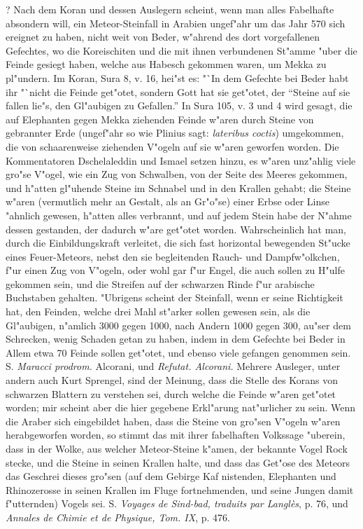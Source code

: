 \documentclass[a4paper, 11pt, oneside, polutonikogreek, german]{article}
\begin{document}
? Nach dem Koran und dessen Auslegern scheint, wenn man alles Fabelhafte absondern will, ein Meteor-Steinfall in Arabien ungef"ahr um das Jahr 570 sich ereignet zu haben, nicht weit von Beder, w"ahrend des dort vorgefallenen Gefechtes, wo die Koreischiten und die mit ihnen verbundenen St"amme "uber die Feinde gesiegt haben, welche aus Habesch gekommen waren, um Mekka zu pl"undern. Im Koran, Sura 8, v. 16, hei"st es: "`In dem Gefechte bei Beder habt ihr "`nicht die Feinde get"otet, sondern Gott hat sie get"otet, der "`Steine auf sie fallen lie"s, den Gl"aubigen zu Gefallen."' In Sura 105, v. 3 und 4 wird gesagt, die auf Elephanten gegen Mekka ziehenden Feinde w"aren durch Steine von gebrannter Erde (ungef"ahr so wie Plinius sagt: \emph{lateribus coctis}) umgekommen, die von schaarenweise ziehenden V"ogeln auf sie w"aren geworfen worden. Die Kommentatoren Dschelaleddin und Ismael setzen hinzu, es w"aren unz"ahlig viele gro"se V"ogel, wie ein Zug von Schwalben, von der Seite des Meeres gekommen, und h"atten gl"uhende Steine im Schnabel und in den Krallen gehabt; die Steine w"aren (vermutlich mehr an Gestalt, als an Gr"o"se) einer Erbse oder Linse "ahnlich gewesen, h"atten alles verbrannt, und auf jedem Stein habe der N"ahme dessen gestanden, der dadurch w"are get"otet worden. Wahrscheinlich hat man, durch die Einbildungskraft verleitet, die sich fast horizontal bewegenden St"ucke eines Feuer-Meteors, nebst den sie begleitenden Rauch- und Dampfw"olkchen, f"ur einen Zug von V"ogeln, oder wohl gar f"ur Engel, die auch sollen zu H"ulfe gekommen sein, und die Streifen auf der schwarzen Rinde f"ur arabische Buchstaben gehalten. "Ubrigens scheint der Steinfall, wenn er seine Richtigkeit hat, den Feinden, welche drei Mahl st"arker sollen gewesen sein, als die Gl"aubigen, n"amlich 3000 gegen 1000, nach Andern 1000 gegen 300, au"ser dem Schrecken, wenig Schaden getan zu haben, indem in dem Gefechte bei Beder in Allem etwa 70 Feinde sollen get"otet, und ebenso viele gefangen genommen sein. S. \emph{Maracci prodrom.} Alcorani, und \emph{Refutat. Alcorani.} Mehrere Ausleger, unter andern auch Kurt Sprengel, sind der Meinung, dass die Stelle des Korans von schwarzen Blattern zu verstehen sei, durch welche die Feinde w"aren get"otet worden; mir scheint aber die hier gegebene Erkl"arung nat"urlicher zu sein. Wenn die Araber sich eingebildet haben, dass die Steine von gro"sen V"ogeln w"aren herabgeworfen worden, so stimmt das mit ihrer fabelhaften Volkssage "uberein, dass in der Wolke, aus welcher Meteor-Steine k"amen, der bekannte Vogel Rock stecke, und die Steine in seinen Krallen halte, und dass das Get"ose des Meteors das Geschrei dieses gro"sen (auf dem Gebirge Kaf nistenden, Elephanten und Rhinozerosse in seinen Krallen im Fluge fortnehmenden, und seine Jungen damit f"utternden) Vogels sei. S. \emph{Voyages de Sind-bad, traduits par Langlès}, p. 76, und \emph{Annales de Chimie et de Physique, Tom. IX}, p. 476.
\end{document}

